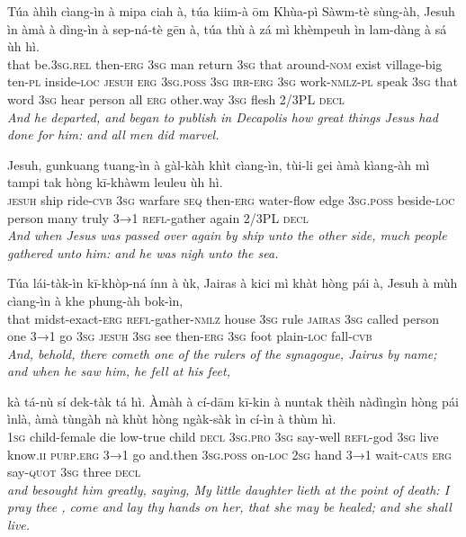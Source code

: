 \documentclass[11pt,a4paper]{article}
\begin{document}
\begin{exe}
\gll Túa àhìh cìang-ìn à mipa ciah à, túa kiim-à ōm Khùa-pì Sàwm-tè sùng-àh, Jesuh ìn àmà à dìng-ìn à sep-ná-tè gēn à, túa thù à zá mì khèmpeuh ìn lam-dàng à sá ùh hì. \\
     that be.\textsc{3sg}.\textsc{rel} then-\textsc{erg} \textsc{3sg} man return \textsc{3sg} that around-\textsc{nom} exist village-big ten-\textsc{pl} inside-\textsc{loc} \textsc{jesuh} \textsc{erg} \textsc{3sg}.\textsc{poss} \textsc{3sg} \textsc{irr}-\textsc{erg} \textsc{3sg} work-\textsc{nmlz}-\textsc{pl} speak \textsc{3sg} that word \textsc{3sg} hear person all \textsc{erg} other.way \textsc{3sg} flesh 2/3PL \textsc{decl} \\
\glt \textcolor{kjvcolor}{\textit{And he departed, and began to publish in Decapolis how great things Jesus had done for him: and all men did marvel.}}

\gll Jesuh, gunkuang tuang-ìn à gàl-kàh khìt cìang-ìn, tùi-li gei àmà kìang-àh mì tampi tak hòng kī-khàwm leuleu ùh hì. \\
     \textsc{jesuh} ship ride-\textsc{cvb} \textsc{3sg} warfare \textsc{seq} then-\textsc{erg} water-flow edge \textsc{3sg}.\textsc{poss} beside-\textsc{loc} person many truly \textsc{3→1} \textsc{refl}-gather again 2/3PL \textsc{decl} \\
\glt \textcolor{kjvcolor}{\textit{And when Jesus was passed over again by ship unto the other side, much people gathered unto him: and he was nigh unto the sea.}}

\gll Túa lái-tàk-ìn kī-khòp-ná ínn à ùk, Jairas à kici mì khàt hòng pái à, Jesuh à mùh cìang-ìn à khe phung-àh bok-ìn, \\
     that midst-exact-\textsc{erg} \textsc{refl}-gather-\textsc{nmlz} house \textsc{3sg} rule \textsc{jairas} \textsc{3sg} called person one \textsc{3→1} go \textsc{3sg} \textsc{jesuh} \textsc{3sg} see then-\textsc{erg} \textsc{3sg} foot plain-\textsc{loc} fall-\textsc{cvb} \\
\glt \textcolor{kjvcolor}{\textit{And, behold, there cometh one of the rulers of the synagogue, Jairus by name; and when he saw him, he fell at his feet,}}

\gll kà tá-nù sí dek-tàk tá hì. Àmàh à cí-dām kī-kin à nuntak thèih nàdìngìn hòng pái ìnlà, àmà tùngàh nà khùt hòng ngàk-sàk ìn cí-ìn à thùm hì. \\
     \textsc{1sg} child-female die low-true child \textsc{decl} \textsc{3sg}.\textsc{pro} \textsc{3sg} say-well \textsc{refl}-god \textsc{3sg} live know.\textsc{ii} \textsc{purp}.\textsc{erg} \textsc{3→1} go and.then \textsc{3sg}.\textsc{poss} on-\textsc{loc} \textsc{2sg} hand \textsc{3→1} wait-\textsc{caus} \textsc{erg} say-\textsc{quot} \textsc{3sg} three \textsc{decl} \\
\glt \textcolor{kjvcolor}{\textit{and besought him greatly, saying, My little daughter lieth at the point of death: I pray thee , come and lay thy hands on her, that she may be healed; and she shall live.}}


\end{exe}
\end{document}
